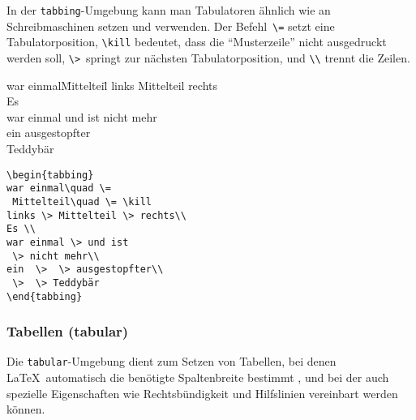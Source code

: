 In der \texttt{tabbing}-Umgebung kann man Tabulatoren ähnlich wie
an Schreibmaschinen setzen und verwenden.
Der Befehl~\verb|\=| setzt eine Tabulatorposition,
\verb|\kill| bedeutet, dass die "`Musterzeile"' nicht ausgedruckt werden
soll,
\verb|\>|~springt zur nächsten Tabulatorposition,
und \verb|\\| trennt die Zeilen.
%
\par\vspace{0pt plus5\baselineskip}
\pagebreak[3]\vspace{0pt plus-5\baselineskip}
%
\exa
\begin{tabbing}
war einmal\quad \=
 Mittelteil\quad \= \kill
links \> Mittelteil \> rechts\\
Es \\
war einmal \> und ist
 \> nicht mehr\\
ein  \>  \> ausgestopfter\\
 \>  \> Teddybär
\end{tabbing}
\exb
\begin{verbatim}
\begin{tabbing}
war einmal\quad \=
 Mittelteil\quad \= \kill
links \> Mittelteil \> rechts\\
Es \\
war einmal \> und ist
 \> nicht mehr\\
ein  \>  \> ausgestopfter\\
 \>  \> Teddybär
\end{tabbing}
\end{verbatim}
\exc


\subsubsection{Tabellen (tabular)} \label{tabular}
 
Die \texttt{tabular}-Umgebung dient zum Setzen von Tabellen, bei
denen \LaTeX\ automatisch die benötigte Spaltenbreite
bestimmt
, und bei der auch spezielle Eigenschaften wie
Rechtsbündigkeit und Hilfslinien vereinbart werden können.
 
